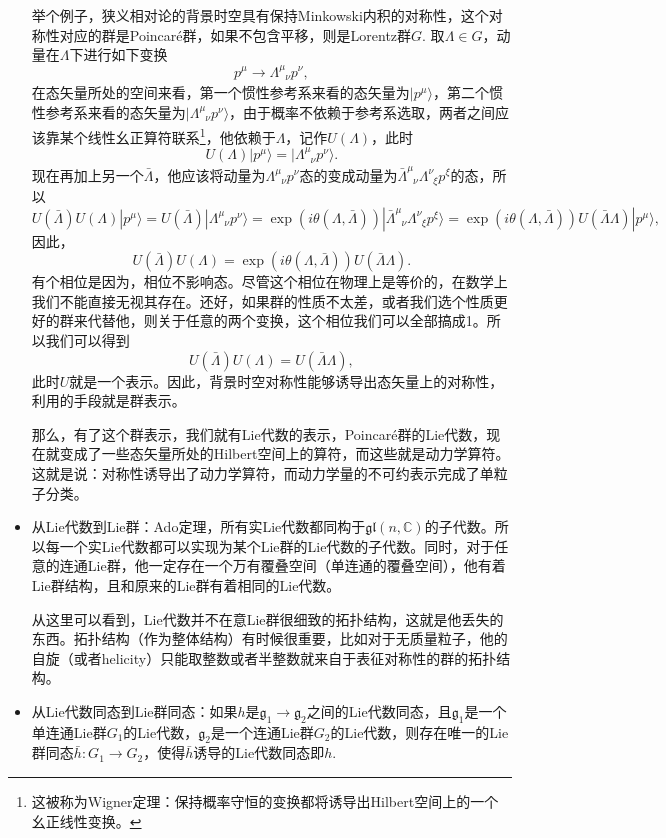 \documentclass[9pt]{extarticle}
\newcommand{\cc}{\mathbb{C}}
\newcommand{\lag}{{\mathfrak{g}}}
\begin{document}
\begin{itemize}
举个例子，狭义相对论的背景时空具有保持Minkowski内积的对称性，这个对称性对应的群是Poincar\'e群，如果不包含平移，则是Lorentz群$G$. 取$\Lambda \in G$，动量在$\Lambda$下进行如下变换
\[
	p^\mu \to \Lambda^\mu_{\phantom{\mu}\nu}p^\nu,
\]
在态矢量所处的空间来看，第一个惯性参考系来看的态矢量为$|p^\mu\rangle$，第二个惯性参考系来看的态矢量为$|\Lambda^\mu_{\phantom{\mu}\nu}p^\nu\rangle$，由于概率不依赖于参考系选取，两者之间应该靠某个线性幺正算符联系\footnote{这被称为Wigner定理：保持概率守恒的变换都将诱导出Hilbert空间上的一个幺正线性变换。}，他依赖于$\Lambda$，记作$U(\Lambda)$，此时
\[
	U(\Lambda)|p^\mu\rangle = |\Lambda^\mu_{\phantom{\mu}\nu}p^\nu\rangle.
\]
现在再加上另一个$\bar\Lambda$，他应该将动量为$\Lambda^\mu_{\phantom{\mu}\nu}p^\nu$态的变成动量为$\bar{\Lambda}^\mu_{\phantom{\mu}\nu}\Lambda^\nu_{\phantom{\nu}\xi}p^\xi$的态，所以
\[
	U(\bar\Lambda)U(\Lambda)|p^\mu\rangle = U(\bar\Lambda)|\Lambda^\mu_{\phantom{\mu}\nu}p^\nu\rangle = \exp(i\theta(\Lambda,\bar\Lambda))|\bar{\Lambda}^\mu_{\phantom{\mu}\nu}\Lambda^\nu_{\phantom{\nu}\xi}p^\xi\rangle = \exp(i\theta(\Lambda,\bar\Lambda))U(\bar\Lambda \Lambda)|p^\mu\rangle,
\]
因此，
\[
	U(\bar\Lambda)U(\Lambda)= \exp(i\theta(\Lambda,\bar\Lambda)) U(\bar\Lambda \Lambda).
\]
有个相位是因为，相位不影响态。尽管这个相位在物理上是等价的，在数学上我们不能直接无视其存在。还好，如果群的性质不太差，或者我们选个性质更好的群来代替他，则关于任意的两个变换，这个相位我们可以全部搞成1。所以我们可以得到
\[
	U(\bar\Lambda)U(\Lambda) = U(\bar\Lambda \Lambda),
\]
此时$U$就是一个表示。因此，背景时空对称性能够诱导出态矢量上的对称性，利用的手段就是群表示。

那么，有了这个群表示，我们就有Lie代数的表示，Poincar\'e群的Lie代数，现在就变成了一些态矢量所处的Hilbert空间上的算符，而这些就是动力学算符。这就是说：对称性诱导出了动力学算符，而动力学量的不可约表示完成了单粒子分类。

\item 从Lie代数到Lie群：Ado定理，所有实Lie代数都同构于$\mathfrak{gl}(n,\cc)$的子代数。所以每一个实Lie代数都可以实现为某个Lie群的Lie代数的子代数。同时，对于任意的连通Lie群，他一定存在一个万有覆叠空间（单连通的覆叠空间），他有着Lie群结构，且和原来的Lie群有着相同的Lie代数。

从这里可以看到，Lie代数并不在意Lie群很细致的拓扑结构，这就是他丢失的东西。拓扑结构（作为整体结构）有时候很重要，比如对于无质量粒子，他的自旋（或者helicity）只能取整数或者半整数就来自于表征对称性的群的拓扑结构。

\item 从Lie代数同态到Lie群同态：如果$h$是$\lag_1\to \lag_2$之间的Lie代数同态，且$\lag_1$是一个单连通Lie群$G_1$的Lie代数，$\lag_2$是一个连通Lie群$G_2$的Lie代数，则存在唯一的Lie群同态$\bar{h}:G_1\to G_2$，使得$\bar{h}$诱导的Lie代数同态即$h$.


\end{itemize}
\end{document}
